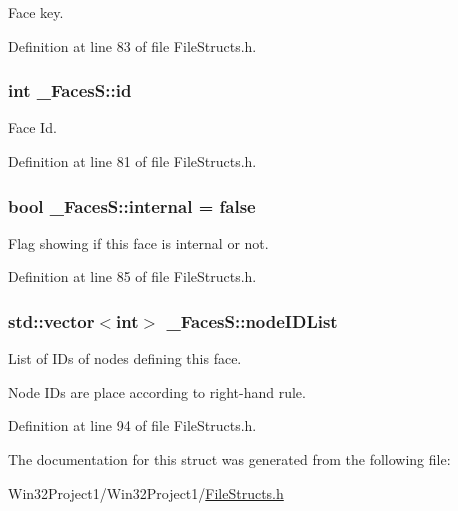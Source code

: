 Face key. 



Definition at line 83 of file File\+Structs.\+h.

\subsubsection[{\texorpdfstring{id}{id}}]{\setlength{\rightskip}{0pt plus 5cm}int \+\_\+\+Faces\+S\+::id}\hypertarget{struct___faces_s_a7365ff5c5951b2a61ef5e4411b0d521a}{}\label{struct___faces_s_a7365ff5c5951b2a61ef5e4411b0d521a}


Face Id. 



Definition at line 81 of file File\+Structs.\+h.

\subsubsection[{\texorpdfstring{internal}{internal}}]{\setlength{\rightskip}{0pt plus 5cm}bool \+\_\+\+Faces\+S\+::internal = false}\hypertarget{struct___faces_s_a5ce239e336aea528dad6008a6f2909f0}{}\label{struct___faces_s_a5ce239e336aea528dad6008a6f2909f0}


Flag showing if this face is internal or not. 



Definition at line 85 of file File\+Structs.\+h.

\subsubsection[{\texorpdfstring{node\+I\+D\+List}{nodeIDList}}]{\setlength{\rightskip}{0pt plus 5cm}std\+::vector$<$int$>$ \+\_\+\+Faces\+S\+::node\+I\+D\+List}\hypertarget{struct___faces_s_a1af35bd658b7be0f98e09deb5f8b3ead}{}\label{struct___faces_s_a1af35bd658b7be0f98e09deb5f8b3ead}


List of I\+Ds of nodes defining this face. 

Node I\+Ds are place according to right-\/hand rule. 

Definition at line 94 of file File\+Structs.\+h.



The documentation for this struct was generated from the following file\+:\begin{DoxyCompactItemize}
\item 
Win32\+Project1/\+Win32\+Project1/\hyperlink{_file_structs_8h}{File\+Structs.\+h}\end{DoxyCompactItemize}
